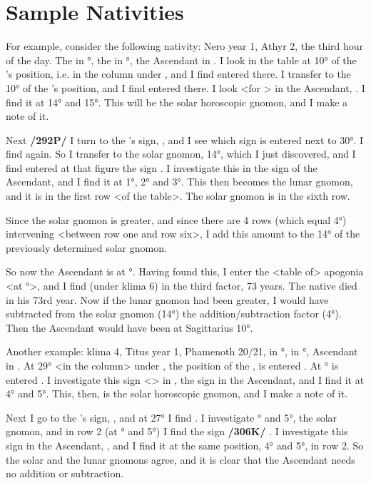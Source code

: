 \section{Sample Nativities}

For example, consider the following nativity: Nero year 1, Athyr 2, the third hour of the day. The \Sun\xspace in \Scorpio\xspace 10°, the \Moon\xspace in \Aquarius\xspace 30°, the Ascendant in \Sagittarius. I look in the table at 10° of the \Sun’s position, i.e. in the column under \Scorpio, and I find \Pisces\xspace entered there. I transfer to \Pisces\xspace the 10° of the \Sun’s position, and I find \Libra\xspace entered there. I look <for \Libra> in the Ascendant, \Sagittarius.
I find it at 14° and 15°. This will be the solar horoscopic gnomon, and I make a note of it. 

Next \textbf{/292P/} I turn to the \Moon’s sign, \Aquarius, and I see which sign is entered next to 30°. I find \Aquarius\xspace again. So
I transfer to \Aquarius\xspace the solar gnomon, 14°, which I just discovered, and I find entered at that figure the sign \Sagittarius. I investigate this in the sign of the Ascendant, and I find it at 1°, 2° and 3°. This then becomes the lunar gnomon, and it is in the first row <of the table>. The solar gnomon is in the sixth row.

Since the solar gnomon is greater, and since there are 4 rows (which equal 4°) intervening <between row one and row six>, I add this amount to the 14° of the previously determined solar gnomon. 

So now the Ascendant is at \Sagittarius\xspace 18°. Having found this, I enter the <table of> apogonia <at \Sagittarius\xspace 18°>, and I find (under klima 6) in the third factor, 73 years. The native died in his 73rd year. Now if the lunar gnomon had been greater, I would have subtracted from the solar gnomon (14°) the addition/subtraction factor (4°). Then the Ascendant would have been at Sagittarius 10°.

Another example: klima 4, Titus year 1, Phamenoth 20/21, \Sun\xspace in \Pisces\xspace 29°, \Moon\xspace in \Capricorn\xspace 27°, Ascendant in \Scorpio. At 29° <in the column> under \Pisces, the position of the \Sun, is entered
\Cancer. At \Cancer\xspace 29° is entered \Capricorn. I investigate this sign <\Capricorn> in \Scorpio, the sign in the Ascendant, and I find it at 4° and 5°. This, then, is the solar horoscopic gnomon, and I make a note of it. 

Next I go to the \Moon’s sign, \Capricorn, and at 27° I find \Aries. I investigate \Aries\xspace 4° and 5°, the solar gnomon, and in row 2 (at \Aries\xspace 4° and 5°) I find the sign \textbf{/306K/} \Capricorn. I investigate this sign in the Ascendant, \Scorpio, and I find it at the same position, 4° and 5°, in row 2. So the solar and the lunar gnomons agree, and it is clear that the Ascendant needs no addition or subtraction. 

